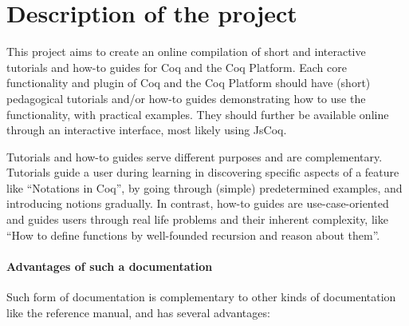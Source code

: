 \documentclass{easychair}
\begin{document}
\section{Description of the project}

This project aims to create an online compilation of short and interactive
tutorials and how-to guides for Coq and the Coq Platform.
Each core functionality and plugin of Coq and the Coq Platform should have
(short) pedagogical tutorials and/or how-to guides demonstrating how to use the
functionality, with practical examples. They should further be available online
through an interactive interface, most likely using JsCoq.

Tutorials and how-to guides serve different purposes and are complementary.
Tutorials guide a user during learning in discovering specific aspects of a
feature like ``Notations in Coq'', by going through (simple) predetermined
examples, and introducing notions gradually. In contrast, how-to guides are
use-case-oriented and guides users through real life problems and their inherent
complexity, like ``How to define functions by well-founded recursion and reason
about them''.

\paragraph{Advantages of such a documentation}

Such form of documentation is complementary to other kinds of documentation like
the reference manual, and has several advantages:
\end{document}
